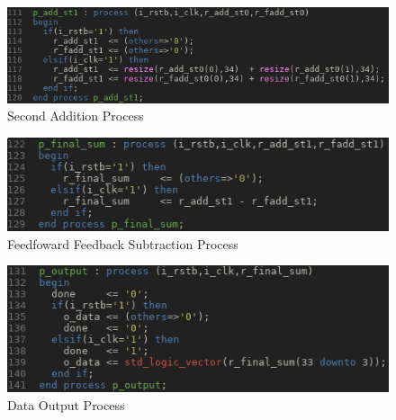 \documentclass[12pt,a4paper,titlepage]{article}
\begin{document}
\begin{figure}[!htb]
  \centering
  \includegraphics[width=\textwidth]
                  {../presentation/add1.png}
                  \caption{Second Addition Process}
                  \label{fig:a3}
\end{figure}
\begin{figure}[!htb]
  \centering
  \includegraphics[width=\textwidth]
                  {../presentation/final-add.png}
                  \caption{Feedfoward Feedback Subtraction Process}
                  \label{fig:a4}
\end{figure}
\begin{figure}[!htb]
  \centering
  \includegraphics[width=\textwidth]
                  {../presentation/output.png}
                  \caption{Data Output Process}
                  \label{fig:a5}
\end{figure}

\newpage
\end{document}
